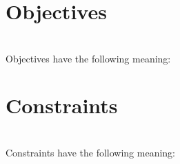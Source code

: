 \documentclass{article}
\begin{document}
\printglossary[type=set]
\printglossary[type=param]
\printglossary[type=var]

\section*{Objectives}
\begin{align}

\end{align}

Objectives have the following meaning:
\begin{itemize}

\end{itemize}

\section*{Constraints}
\begin{align}

\end{align}

Constraints have the following meaning:
\begin{itemize}

\end{itemize}
\end{document}
